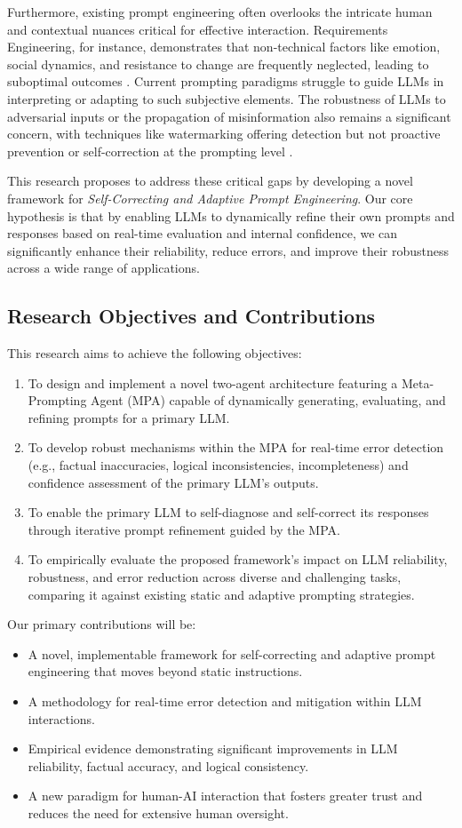 \documentclass{article}
\begin{document}
Furthermore, existing prompt engineering often overlooks the intricate human and contextual nuances critical for effective interaction. Requirements Engineering, for instance, demonstrates that non-technical factors like emotion, social dynamics, and resistance to change are frequently neglected, leading to suboptimal outcomes \cite{P2}. Current prompting paradigms struggle to guide LLMs in interpreting or adapting to such subjective elements. The robustness of LLMs to adversarial inputs or the propagation of misinformation also remains a significant concern, with techniques like watermarking offering detection but not proactive prevention or self-correction at the prompting level \cite{P3}.

This research proposes to address these critical gaps by developing a novel framework for \textit{Self-Correcting and Adaptive Prompt Engineering}. Our core hypothesis is that by enabling LLMs to dynamically refine their own prompts and responses based on real-time evaluation and internal confidence, we can significantly enhance their reliability, reduce errors, and improve their robustness across a wide range of applications.

\subsection{Research Objectives and Contributions}
This research aims to achieve the following objectives:
\begin{enumerate}
    \item To design and implement a novel two-agent architecture featuring a Meta-Prompting Agent (MPA) capable of dynamically generating, evaluating, and refining prompts for a primary LLM.
    \item To develop robust mechanisms within the MPA for real-time error detection (e.g., factual inaccuracies, logical inconsistencies, incompleteness) and confidence assessment of the primary LLM's outputs.
    \item To enable the primary LLM to self-diagnose and self-correct its responses through iterative prompt refinement guided by the MPA.
    \item To empirically evaluate the proposed framework's impact on LLM reliability, robustness, and error reduction across diverse and challenging tasks, comparing it against existing static and adaptive prompting strategies.
\end{enumerate}

Our primary contributions will be:
\begin{itemize}
    \item A novel, implementable framework for self-correcting and adaptive prompt engineering that moves beyond static instructions.
    \item A methodology for real-time error detection and mitigation within LLM interactions.
    \item Empirical evidence demonstrating significant improvements in LLM reliability, factual accuracy, and logical consistency.
    \item A new paradigm for human-AI interaction that fosters greater trust and reduces the need for extensive human oversight.
\end{itemize}
\end{document}
